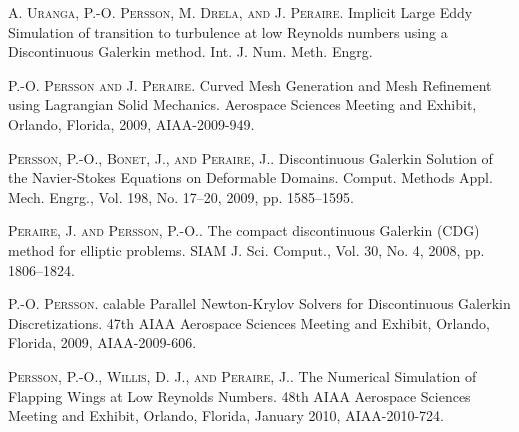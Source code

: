 
\begin{thebibliography}{10}
\textsc{A. Uranga, P.-O. Persson, M. Drela, and J. Peraire}. {Implicit Large Eddy Simulation of transition to turbulence at low Reynolds numbers using a Discontinuous Galerkin method}. Int. J. Num. Meth. Engrg.

\textsc{P.-O. Persson and J. Peraire}. {Curved Mesh Generation and Mesh Refinement using Lagrangian Solid Mechanics}. Aerospace Sciences Meeting and Exhibit, Orlando, Florida, 2009, AIAA-2009-949.

\textsc{Persson, P.-O., Bonet, J., and Peraire, J.}. {Discontinuous Galerkin Solution of the Navier-Stokes Equations on Deformable Domains}. Comput. Methods Appl. Mech. Engrg., Vol. 198, No. 17--20, 2009, pp. 1585--1595.

\textsc{Peraire, J. and Persson, P.-O.}. {The compact discontinuous Galerkin (CDG) method for elliptic problems}. SIAM J. Sci. Comput., Vol. 30, No. 4, 2008, pp. 1806--1824.

\textsc{P.-O. Persson}. {calable Parallel Newton-Krylov Solvers for Discontinuous Galerkin Discretizations}. 47th AIAA Aerospace Sciences Meeting and Exhibit, Orlando, Florida, 2009, AIAA-2009-606.

\textsc{Persson, P.-O., Willis, D. J., and Peraire, J.}. {The Numerical Simulation of Flapping Wings at Low Reynolds Numbers}. 48th AIAA Aerospace Sciences Meeting and Exhibit, Orlando, Florida, January 2010, AIAA-2010-724.
\end{thebibliography}